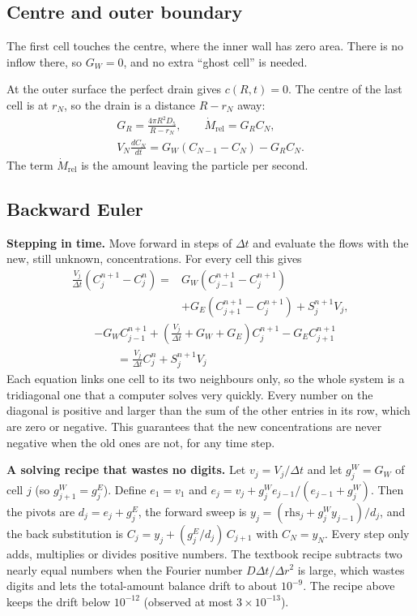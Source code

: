 \documentclass[11pt]{article}
\begin{document}
\subsection{Centre and outer boundary}
The first cell touches the centre, where the inner wall has zero area. There is no inflow there, so $G_W=0$, and no extra ``ghost cell'' is needed.

At the outer surface the perfect drain gives $c(R,t)=0$. The centre of the last cell is at $r_N$, so the drain is a distance $R-r_N$ away:
\begin{equation}
\begin{gathered}
G_R=\frac{4\pi R^2D_5}{R-r_N},\qquad \dot M_{\mathrm{rel}}=G_RC_N,\\
V_N\frac{dC_N}{dt}=G_W(C_{N-1}-C_N)-G_RC_N.
\end{gathered}
\tag{TRISO-DEL-030}
\end{equation}
The term $\dot M_{\mathrm{rel}}$ is the amount leaving the particle per second.

\subsection{Backward Euler}
\textbf{Stepping in time.} Move forward in steps of $\Delta t$ and evaluate the flows with the new, still unknown, concentrations. For every cell this gives
\[
\begin{aligned}
\frac{V_j}{\Delta t}\left(C_j^{n+1}-C_j^n\right)={}&G_W\left(C_{j-1}^{n+1}-C_j^{n+1}\right)\\
&+G_E\left(C_{j+1}^{n+1}-C_j^{n+1}\right)+S_j^{n+1}V_j,
\end{aligned}
\]
\begin{equation}
\boxed{
\begin{aligned}
&-G_WC_{j-1}^{n+1}+\left(\frac{V_j}{\Delta t}+G_W+G_E\right)C_j^{n+1}-G_EC_{j+1}^{n+1}\\
&\qquad=\frac{V_j}{\Delta t}C_j^n+S_j^{n+1}V_j
\end{aligned}}
\tag{TRISO-DEL-040}
\end{equation}
Each equation links one cell to its two neighbours only, so the whole system is a tridiagonal one that a computer solves very quickly. Every number on the diagonal is positive and larger than the sum of the other entries in its row, which are zero or negative. This guarantees that the new concentrations are never negative when the old ones are not, for any time step.

\textbf{A solving recipe that wastes no digits.} Let $v_j=V_j/\Delta t$ and let $g_j^W=G_W$ of cell $j$ (so $g^W_{j+1}=g^E_j$). Define $e_1=v_1$ and $e_j=v_j+g^W_je_{j-1}/(e_{j-1}+g^W_j)$. Then the pivots are $d_j=e_j+g^E_j$, the forward sweep is $y_j=(\mathrm{rhs}_j+g^W_jy_{j-1})/d_j$, and the back substitution is $C_j=y_j+(g^E_j/d_j)\,C_{j+1}$ with $C_N=y_N$. Every step only adds, multiplies or divides positive numbers. The textbook recipe subtracts two nearly equal numbers when the Fourier number $D\Delta t/\Delta r^2$ is large, which wastes digits and lets the total-amount balance drift to about $10^{-9}$. The recipe above keeps the drift below $10^{-12}$ (observed at most $3\times10^{-13}$).
\end{document}
